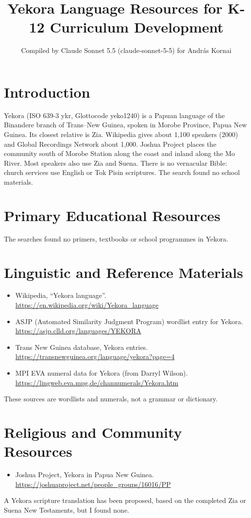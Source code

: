 \documentclass[12pt]{article}
\title{Yekora Language Resources for K-12 Curriculum Development}
\author{Compiled by Claude Sonnet 5.5 (claude-sonnet-5-5) for Andr\'as Kornai}
\date{}
\begin{document}
\maketitle

\section{Introduction}
Yekora (ISO 639-3 ykr, Glottocode yeko1240) is a Papuan language of the Binandere branch of Trans--New Guinea, spoken in Morobe Province, Papua New Guinea. Its closest relative is Zia. Wikipedia gives about 1,100 speakers (2000) and Global Recordings Network about 1,000. Joshua Project places the community south of Morobe Station along the coast and inland along the Mo River. Most speakers also use Zia and Suena. There is no vernacular Bible: church services use English or Tok Pisin scriptures. The search found no school materials.

\section{Primary Educational Resources}
The searches found no primers, textbooks or school programmes in Yekora.

\section{Linguistic and Reference Materials}
\begin{itemize}
\item Wikipedia, ``Yekora language''. \url{https://en.wikipedia.org/wiki/Yekora_language}
\item ASJP (Automated Similarity Judgment Program) wordlist entry for Yekora. \url{https://asjp.clld.org/languages/YEKORA}
\item Trans New Guinea database, Yekora entries. \url{https://transnewguinea.org/language/yekora?page=4}
\item MPI EVA numeral data for Yekora (from Darryl Wilson). \url{https://lingweb.eva.mpg.de/channumerals/Yekora.htm}
\end{itemize}
These sources are wordlists and numerals, not a grammar or dictionary.

\section{Religious and Community Resources}
\begin{itemize}
\item Joshua Project, Yekora in Papua New Guinea. \url{https://joshuaproject.net/people_groups/16016/PP}
\end{itemize}
A Yekora scripture translation has been proposed, based on the completed Zia or Suena New Testaments, but I found none.
\end{document}
